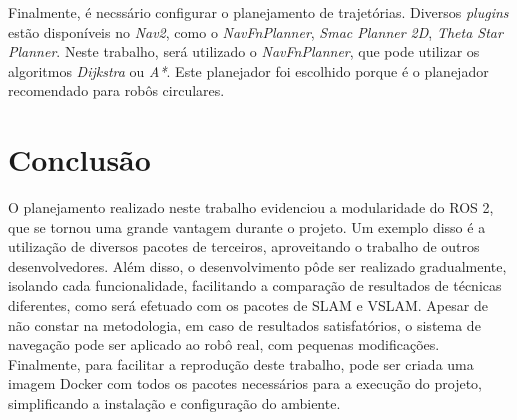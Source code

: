 \documentclass[repeatfields,xlists,xpacks,oneside,yearsonly]{ufrgscca}
\begin{document}
Finalmente, é necssário configurar o planejamento de trajetórias.
Diversos \textit{plugins}  estão disponíveis no \textit{Nav2},
como o \textit{NavFnPlanner}, \textit{Smac Planner 2D}, \textit{Theta Star Planner}.
Neste trabalho, será utilizado o \textit{NavFnPlanner}, que pode utilizar
os algoritmos \textit{Dijkstra} ou \textit{A*}.
Este planejador foi escolhido porque é o planejador recomendado para
robôs circulares.

\chapter{Conclusão}
\label{conclusao}

O planejamento realizado neste trabalho evidenciou a modularidade do ROS 2,
que se tornou uma grande vantagem durante o projeto.
Um exemplo disso é a utilização de diversos pacotes de terceiros,
aproveitando o trabalho de outros desenvolvedores.
Além disso, o desenvolvimento pôde ser realizado gradualmente,
isolando cada funcionalidade, facilitando a comparação
de resultados de técnicas diferentes, como será efetuado com os pacotes de SLAM
e VSLAM.
Apesar de não constar na metodologia, em caso de resultados satisfatórios,
o sistema de navegação pode ser aplicado ao robô real, com pequenas
modificações.
Finalmente, para facilitar a reprodução deste trabalho, pode ser
criada uma imagem Docker com todos os pacotes necessários para a execução do
projeto, simplificando a instalação e configuração do ambiente.


\printbibliography

%
%
%
\end{document}
